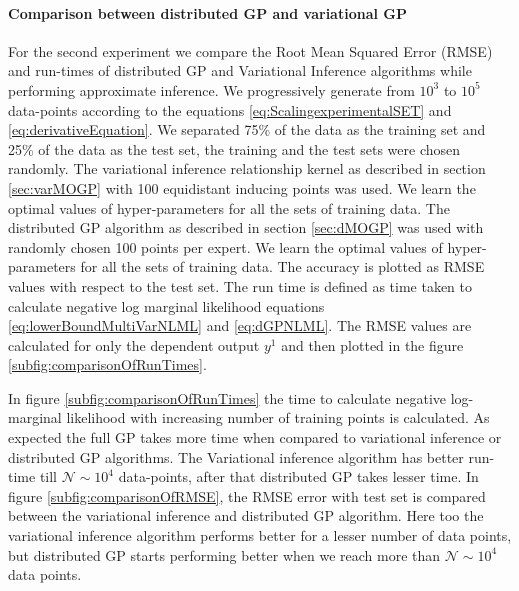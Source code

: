 \paragraph{\textbf{Comparison between distributed GP and variational GP}}
For the second experiment we compare the Root Mean Squared Error (RMSE) and run-times of distributed GP and Variational Inference algorithms while performing approximate inference. We progressively generate from $10^3$ to $10^5$ data-points according to the equations \ref{eq:ScalingexperimentalSET} and \ref{eq:derivativeEquation}. We separated 75\% of the data as the training set and 25\% of the data as the test set, the training and the test sets were chosen randomly. The variational inference relationship kernel as described in section \ref{sec:varMOGP} with 100 equidistant inducing points was used. We learn the optimal values of hyper-parameters for all the sets of training data. The distributed GP algorithm as described in section \ref{sec:dMOGP} was used with randomly chosen 100 points per expert. We learn the optimal values of hyper-parameters for all the sets of training data. The accuracy is plotted as RMSE values with respect to the test set. The run time is defined as time taken to calculate negative log marginal likelihood equations \ref{eq:lowerBoundMultiVarNLML} and  \ref{eq:dGPNLML}. The RMSE values are calculated for only the dependent output \(y^{1}\) and then plotted in the figure \ref{subfig:comparisonOfRunTimes}. 

In figure \ref{subfig:comparisonOfRunTimes} the time to calculate negative log-marginal likelihood with increasing number of training points is calculated. As expected the full GP takes more time when compared to variational inference or distributed GP algorithms. The Variational inference algorithm has better run-time till $\mathcal{N} \sim 10^4$ data-points, after that distributed GP takes lesser time. In figure \ref{subfig:comparisonOfRMSE}, the RMSE error with test set is compared between the variational inference and distributed GP algorithm. Here too the variational inference algorithm performs better for a lesser number of data points, but distributed GP starts performing better when we reach more than $\mathcal{N} \sim 10^4$ data points. 

